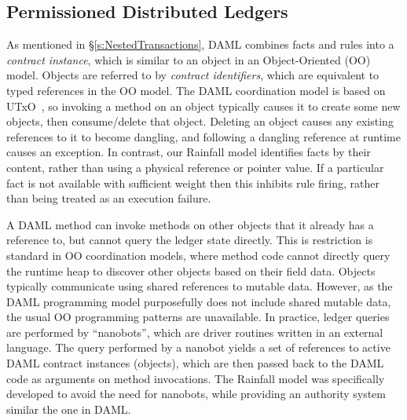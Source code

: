 


\subsection{Permissioned Distributed Ledgers}
\label{s:RelatedPermissioned}
As mentioned in \S\ref{s:NestedTransactions}, DAML combines facts and rules into a \emph{contract instance}, which is similar to an object in an Object-Oriented (OO) model. Objects are referred to by \emph{contract identifiers}, which are equivalent to typed references in the OO model. The DAML coordination model is based on UTxO~\cite{Zahnentferner2018:UTxO}, so invoking a method on an object typically causes it to create some new objects, then consume/delete that object. Deleting an object causes any existing references to it to become dangling, and following a dangling reference at runtime causes an exception. In contrast, our Rainfall model identifies facts by their content, rather than using a physical reference or pointer value. If a particular fact is not available with sufficient weight then this inhibits rule firing, rather than being treated as an execution failure.

A DAML method can invoke methods on other objects that it already has a reference to, but cannot query the ledger state directly. This is restriction is standard in OO coordination models, where method code cannot directly query the runtime heap to discover other objects based on their field data. Objects typically communicate using shared references to mutable data. However, as the DAML programming model purposefully does not include shared mutable data, the usual OO programming patterns are unavailable. In practice, ledger queries are performed by ``nanobots'', which are driver routines written in an external language. The query performed by a nanobot yields a set of references to active DAML contract instances (objects), which are then passed back to the DAML code as arguments on method invocations. The Rainfall model was specifically developed to avoid the need for nanobots, while providing an authority system similar the one in DAML.

